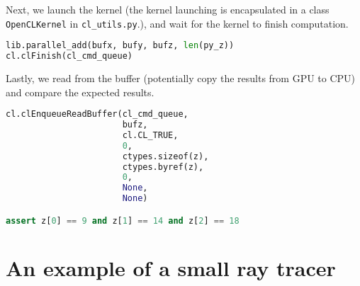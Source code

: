 Next, we launch the kernel (the kernel launching is encapsulated in a class \lstinline{OpenCLKernel} in \lstinline{cl_utils.py}.), and wait for the kernel to finish computation.
\begin{lstlisting}[language=python]
lib.parallel_add(bufx, bufy, bufz, len(py_z))
cl.clFinish(cl_cmd_queue)
\end{lstlisting}

Lastly, we read from the buffer (potentially copy the results from GPU to CPU) and compare the expected results.
\begin{lstlisting}[language=python]
cl.clEnqueueReadBuffer(cl_cmd_queue,
                       bufz,
                       cl.CL_TRUE,
                       0,
                       ctypes.sizeof(z),
                       ctypes.byref(z),
                       0,
                       None,
                       None)

assert z[0] == 9 and z[1] == 14 and z[2] == 18
\end{lstlisting}

\section{An example of a small ray tracer}

